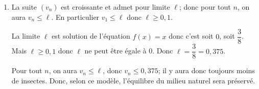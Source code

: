 \begin{enumerate}
\begin{enumerate}
On note $\ell$ la valeur de sa limite. On admet que $\ell$ est solution de l'équation $f(x) = x$.

		\item %
La suite $(v_n)$ est croissante et admet pour limite $\ell$; donc pour tout $n$, on aura $v_n \leqslant \ell$. En particulier $v_1\leqslant \ell$ donc $\ell\geqslant 0,1$.

La limite $\ell$ est solution de l'équation $f(x) = x$ donc c'est soit $0$, soit $\dfrac{3}{8}$. Mais $\ell\geqslant 0,1$ donc $\ell$ ne peut être égale à 0.
Donc $\ell=\dfrac{3}{8}=0,375$.		
		
Pour tout $n$, on aura $v_n\leqslant \ell$, donc $v_n \leqslant 0,375$; il y aura donc toujours moins de  insectes. Donc, selon ce modèle,  l'équilibre du milieu naturel sera préservé.
	\end{enumerate}	
\end{enumerate}

